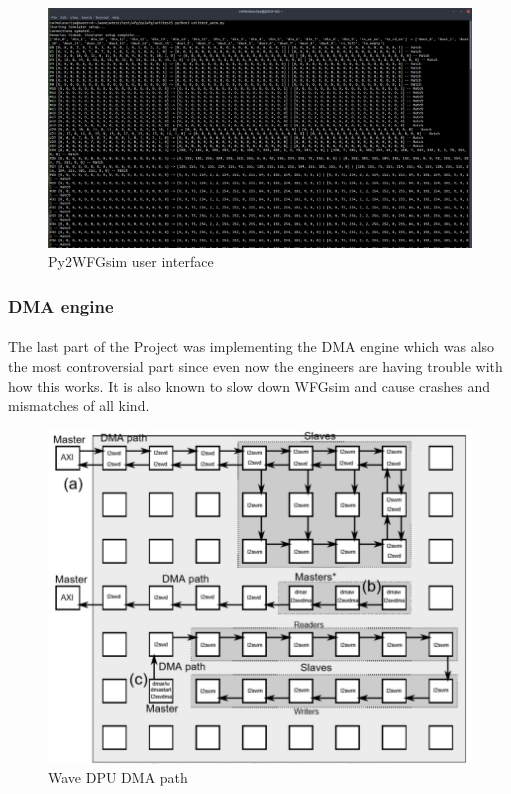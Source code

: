 \begin{figure}[H]
    \centering
    \includegraphics[trim=0cm 0cm 0cm 0cm, clip=true,scale=0.3]{figures/sim_result.png}
    \caption{Py2WFGsim user interface\label{Fig:simresult}}\vspace{-4mm}
    \end{figure}

\subsubsection{DMA engine}
\paragraph{}
The last part of the Project was implementing the DMA engine which was also the most controversial part since even now the engineers are having trouble with how this works. It is also known to slow down WFGsim and cause crashes and mismatches of all kind.

\begin{figure}[H]
    \centering
    \includegraphics[trim=0cm 0cm 0cm 0cm, clip=true,scale=0.5]{figures/dma_path.jpg}
    \caption{Wave DPU DMA path\label{Fig:dmapath}}\vspace{-4mm}
    \end{figure}

